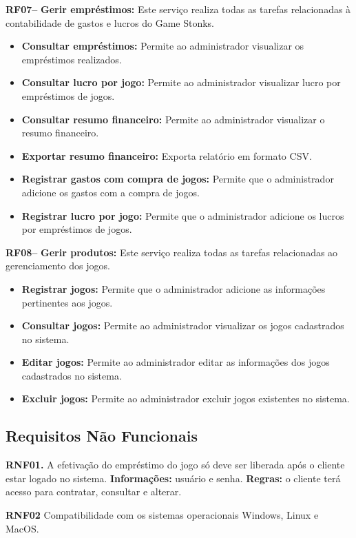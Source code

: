 \documentclass[a4paper, 12pt]{article}
\begin{document}
\textbf{RF07--} \textbf{Gerir empréstimos:} Este serviço realiza todas as tarefas relacionadas à contabilidade de gastos e lucros do Game Stonks.
\begin{itemize}
    \item \textbf{Consultar empréstimos:} Permite ao administrador visualizar os empréstimos realizados.
    \item \textbf{Consultar lucro por jogo:} Permite ao administrador visualizar lucro por empréstimos de jogos.
    \item \textbf{Consultar resumo financeiro:} Permite ao administrador visualizar o resumo financeiro.
    \item \textbf{Exportar resumo financeiro:} Exporta relatório em formato CSV.
    \item \textbf{Registrar gastos com compra de jogos:} Permite que o administrador adicione os gastos com a compra de jogos.
    \item \textbf{Registrar lucro por jogo:} Permite que o administrador adicione os lucros por empréstimos de jogos.
\end{itemize}

\textbf{RF08--} \textbf{Gerir produtos:} Este serviço realiza todas as tarefas relacionadas ao gerenciamento dos jogos.
\begin{itemize}
    \item \textbf{Registrar jogos:} Permite que o administrador adicione as informações pertinentes aos jogos.
    \item \textbf{Consultar jogos:} Permite ao administrador visualizar os jogos cadastrados no sistema.
    \item \textbf{Editar jogos:} Permite ao administrador editar as informações dos jogos cadastrados no sistema.
    \item \textbf{Excluir jogos:} Permite ao administrador excluir jogos existentes no sistema.
\end{itemize}

\subsection{Requisitos Não Funcionais}
\textbf{RNF01.} A efetivação do empréstimo do jogo só deve ser liberada após o cliente estar
logado no sistema.
\textbf{Informações:} usuário e senha.
\textbf{Regras:} o cliente terá acesso para contratar, consultar e alterar. 

\textbf{RNF02} Compatibilidade com os sistemas operacionais Windows, Linux e MacOS.
\end{document}
